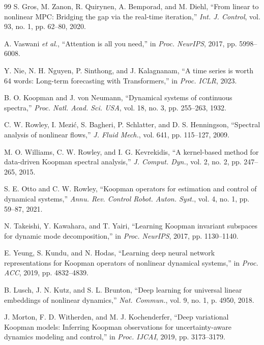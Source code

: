 \documentclass[journal]{IEEEtran}
\begin{document}
\begin{thebibliography}{99}
S. Gros, M. Zanon, R. Quirynen, A. Bemporad, and M. Diehl, ``From linear to nonlinear MPC: Bridging the gap via the real-time iteration,'' \emph{Int. J. Control}, vol. 93, no. 1, pp. 62--80, 2020.

A. Vaswani \emph{et al.}, ``Attention is all you need,'' in \emph{Proc. NeurIPS}, 2017, pp. 5998--6008.

Y. Nie, N. H. Nguyen, P. Sinthong, and J. Kalagnanam, ``A time series is worth 64 words: Long-term forecasting with Transformers,'' in \emph{Proc. ICLR}, 2023.

B. O. Koopman and J. von Neumann, ``Dynamical systems of continuous spectra,'' \emph{Proc. Natl. Acad. Sci. USA}, vol. 18, no. 3, pp. 255--263, 1932.

C. W. Rowley, I. Mezi\'c, S. Bagheri, P. Schlatter, and D. S. Henningson, ``Spectral analysis of nonlinear flows,'' \emph{J. Fluid Mech.}, vol. 641, pp. 115--127, 2009.

M. O. Williams, C. W. Rowley, and I. G. Kevrekidis, ``A kernel-based method for data-driven Koopman spectral analysis,'' \emph{J. Comput. Dyn.}, vol. 2, no. 2, pp. 247--265, 2015.

S. E. Otto and C. W. Rowley, ``Koopman operators for estimation and control of dynamical systems,'' \emph{Annu. Rev. Control Robot. Auton. Syst.}, vol. 4, no. 1, pp. 59--87, 2021.

N. Takeishi, Y. Kawahara, and T. Yairi, ``Learning Koopman invariant subspaces for dynamic mode decomposition,'' in \emph{Proc. NeurIPS}, 2017, pp. 1130--1140.

E. Yeung, S. Kundu, and N. Hodas, ``Learning deep neural network representations for Koopman operators of nonlinear dynamical systems,'' in \emph{Proc. ACC}, 2019, pp. 4832--4839.

B. Lusch, J. N. Kutz, and S. L. Brunton, ``Deep learning for universal linear embeddings of nonlinear dynamics,'' \emph{Nat. Commun.}, vol. 9, no. 1, p. 4950, 2018.

J. Morton, F. D. Witherden, and M. J. Kochenderfer, ``Deep variational Koopman models: Inferring Koopman observations for uncertainty-aware dynamics modeling and control,'' in \emph{Proc. IJCAI}, 2019, pp. 3173--3179.


\end{thebibliography}
\end{document}
